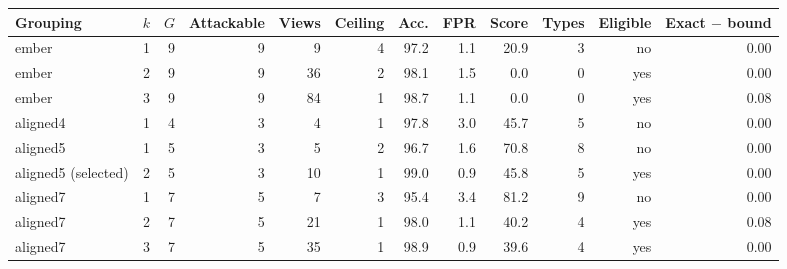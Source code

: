 \begin{tabular}{lrrrrrrrrrrr}
\toprule
Grouping & $k$ & $G$ & Attackable & Views & Ceiling & Acc. & FPR & Score & Types & Eligible & Exact $-$ bound \\
\midrule
ember & 1 & 9 & 9 & 9 & 4 & 97.2 & 1.1 & 20.9 & 3 & no & 0.00 \\
ember & 2 & 9 & 9 & 36 & 2 & 98.1 & 1.5 & 0.0 & 0 & yes & 0.00 \\
ember & 3 & 9 & 9 & 84 & 1 & 98.7 & 1.1 & 0.0 & 0 & yes & 0.08 \\
aligned4 & 1 & 4 & 3 & 4 & 1 & 97.8 & 3.0 & 45.7 & 5 & no & 0.00 \\
aligned5 & 1 & 5 & 3 & 5 & 2 & 96.7 & 1.6 & 70.8 & 8 & no & 0.00 \\
aligned5 (selected) & 2 & 5 & 3 & 10 & 1 & 99.0 & 0.9 & 45.8 & 5 & yes & 0.00 \\
aligned7 & 1 & 7 & 5 & 7 & 3 & 95.4 & 3.4 & 81.2 & 9 & no & 0.00 \\
aligned7 & 2 & 7 & 5 & 21 & 1 & 98.0 & 1.1 & 40.2 & 4 & yes & 0.08 \\
aligned7 & 3 & 7 & 5 & 35 & 1 & 98.9 & 0.9 & 39.6 & 4 & yes & 0.00 \\
\bottomrule
\end{tabular}
